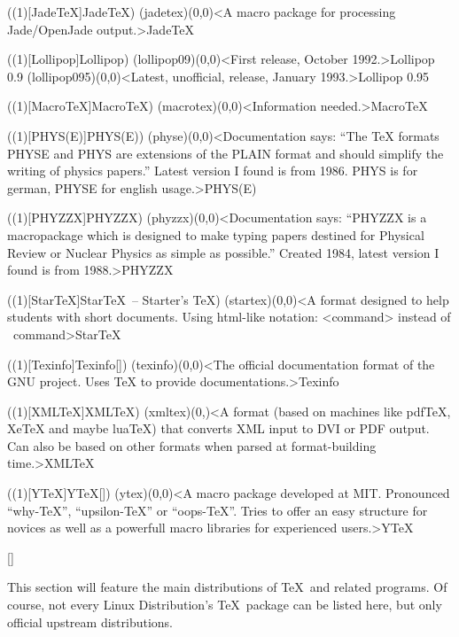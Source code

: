 \tograph(\tostruct(1)[Jade\TeX]{Jade\TeX}){
	\tonode(jadetex)(0,0)<A macro package for processing Jade/OpenJade output.>{Jade\TeX}
}

\tograph(\tostruct(1)[Lollipop]{Lollipop}){
	\tonode(lollipop09)(0,0)<First release, October 1992.>{Lollipop 0.9}
	\steplayer
	\tonode(lollipop095)(0,0)<Latest, unofficial, release, January 1993.>{Lollipop 0.95}
}

\tograph(\tostruct(1)[Macro\TeX]{Macro\TeX}){
	\tonode(macrotex)(0,0)<Information needed.>{Macro\TeX}
}

\tograph(\tostruct(1)[PHYS(E)]{PHYS(E)}){
	\tonode(physe)(0,0)<Documentation says: “The TeX formats PHYSE and PHYS are extensions of the PLAIN format
and should simplify the writing of physics papers.” Latest version I found is from 1986. PHYS is for german, PHYSE for english usage.>{PHYS(E)}
}

\tograph(\tostruct(1)[PHYZZX]{PHYZZX}){
	\tonode(phyzzx)(0,0)<Documentation says: “PHYZZX is a macropackage which is designed to make typing papers destined for Physical Review or Nuclear Physics as simple as possible.” Created 1984, latest version I found is from 1988.>{PHYZZX}
}

\tograph(\tostruct(1)[Star\TeX]{Star\TeX\ – Starter's \TeX}){
	\tonode(startex)(0,0)<A format designed to help students with short documents. Using html-like notation: <command> instead of \ command>{Star\TeX}
}

\tograph(\tostruct(1)[Texinfo]{Texinfo}[\normalimportant]){
	\tonode(texinfo)(0,0)<The official documentation format of the GNU project. Uses TeX to provide documentations.>{Texinfo}
}

\tograph(\tostruct(1)[XML\TeX]{XML\TeX}){
  \tonode(xmltex)(0,\layer)<A format (based on machines like pdfTeX, XeTeX and maybe luaTeX) that converts XML input to DVI or PDF output. Can also be based on other formats when parsed at format-building time.>{XML\TeX}
}

\tograph(\tostruct(1)[Y\TeX]{Y\TeX}[\experimental]){
	\tonode(ytex)(0,0)<A macro package developed at MIT. Pronounced “why-TeX”, “upsilon-TeX” or “oops-TeX”. Tries to offer an easy structure for novices as well as a powerfull macro libraries for experienced users.>{Y\TeX}
}

\clearpage

[\distro]
\parbox{\textwidth}{\normalsize
This section will feature the main distributions of \TeX\ and related programs. Of course, not every Linux Distribution's \TeX\ package can be listed here, but only official upstream distributions.
}

